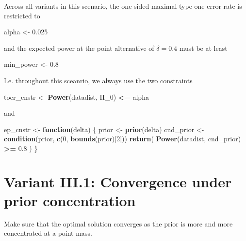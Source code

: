 \documentclass[]{book}
\newenvironment{Shaded}{\begin{snugshade}}{\end{snugshade}}
\newcommand{\ControlFlowTok}[1]{\textcolor[rgb]{0.13,0.29,0.53}{\textbf{#1}}}
\newcommand{\DecValTok}[1]{\textcolor[rgb]{0.00,0.00,0.81}{#1}}
\newcommand{\FloatTok}[1]{\textcolor[rgb]{0.00,0.00,0.81}{#1}}
\newcommand{\KeywordTok}[1]{\textcolor[rgb]{0.13,0.29,0.53}{\textbf{#1}}}
\newcommand{\NormalTok}[1]{#1}
\newcommand{\OperatorTok}[1]{\textcolor[rgb]{0.81,0.36,0.00}{\textbf{#1}}}
\newcommand{\StringTok}[1]{\textcolor[rgb]{0.31,0.60,0.02}{#1}}
\begin{document}
Across all variants in this scenario, the one-sided maximal
type one error rate is restricted to

\begin{Shaded}
\begin{Highlighting}[]
\NormalTok{alpha <-}\StringTok{ }\FloatTok{0.025}
\end{Highlighting}
\end{Shaded}

and the expected power at the point alternative of \(\delta=0.4\) must
be at least

\begin{Shaded}
\begin{Highlighting}[]
\NormalTok{min_power <-}\StringTok{ }\FloatTok{0.8}
\end{Highlighting}
\end{Shaded}

I.e. throughout this sceanrio, we always use the two
constraints

\begin{Shaded}
\begin{Highlighting}[]
\NormalTok{toer_cnstr <-}\StringTok{ }\KeywordTok{Power}\NormalTok{(datadist, H_}\DecValTok{0}\NormalTok{) }\OperatorTok{<=}\StringTok{ }\NormalTok{alpha}
\end{Highlighting}
\end{Shaded}

and

\begin{Shaded}
\begin{Highlighting}[]
\NormalTok{ep_cnstr <-}\StringTok{ }\ControlFlowTok{function}\NormalTok{(delta) \{}
\NormalTok{    prior     <-}\StringTok{ }\KeywordTok{prior}\NormalTok{(delta)}
\NormalTok{    cnd_prior <-}\StringTok{ }\KeywordTok{condition}\NormalTok{(prior, }\KeywordTok{c}\NormalTok{(}\DecValTok{0}\NormalTok{, }\KeywordTok{bounds}\NormalTok{(prior)[}\DecValTok{2}\NormalTok{]))}
    \KeywordTok{return}\NormalTok{( }\KeywordTok{Power}\NormalTok{(datadist, cnd_prior) }\OperatorTok{>=}\StringTok{ }\FloatTok{0.8}\NormalTok{ )}
\NormalTok{\}}
\end{Highlighting}
\end{Shaded}

\hypertarget{variantIII_1}{%
\section{Variant III.1: Convergence under prior concentration}\label{variantIII_1}}

Make sure that the optimal solution converges as the prior is more and more
concentrated at a point mass.
\end{document}
